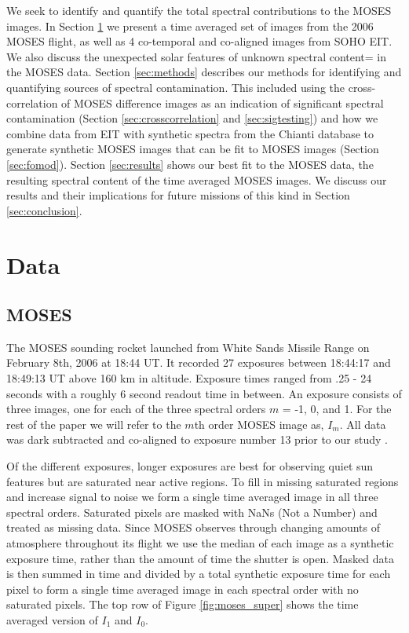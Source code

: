 	We seek to identify and quantify the total spectral contributions to the MOSES images.
	In Section \ref{sec:data} we present a time averaged set of images from the 2006 MOSES flight, as well as 4 co-temporal and co-aligned images from SOHO EIT.
	We also discuss the unexpected solar features of unknown spectral content= in the MOSES data.
	Section \ref{sec:methods} describes our methods for identifying and quantifying sources of spectral contamination.  
	This included using the cross-correlation of MOSES difference images as an indication of significant spectral contamination (Section \ref{sec:crosscorrelation} and \ref{sec:sigtesting}) and how we combine data from EIT with synthetic spectra from the Chianti database \citep{ChiantiI,ChiantiX} to generate synthetic MOSES images that can be fit to MOSES images (Section \ref{sec:fomod}).
	Section \ref{sec:results} shows our best fit to the MOSES data, the resulting spectral content of the time averaged MOSES images.
	We discuss our results and their implications for future missions of this kind in Section \ref{sec:conclusion}.   


\section{Data}\label{sec:data}

	\subsection{MOSES}\label{sec:MOSES_data}
	
		The MOSES sounding rocket launched from White Sands Missile Range on February 8th, 2006 at 18:44 UT. 
		It recorded 27 exposures between 18:44:17 and 18:49:13 UT above 160 km in altitude.  
		Exposure times ranged from .25 - 24 seconds with a roughly 6 second readout time in between.  
		An exposure consists of three images, one for each of the three spectral orders $m$ = -1, 0, and 1.
		For the rest of the paper we will refer to the $m$th order MOSES image as, $I_m$.  
		All data was dark subtracted and co-aligned to exposure number 13 prior to our study \citep{Fox2011}. 
		
		Of the different exposures, longer exposures are best for observing quiet sun features but are saturated near active regions.  
		To fill in missing saturated regions and increase signal to noise we form a single time averaged image in all three spectral orders. 
		Saturated pixels are masked with NaNs (Not a Number) and treated as missing data. 
		Since MOSES observes through changing amounts of atmosphere throughout its flight we use the median of each image as a synthetic exposure time, rather than the amount of time the shutter is open.
		Masked data is then summed in time and divided by a total synthetic exposure time for each pixel to form a single time averaged image in each spectral order with no saturated pixels.  
		The top row of Figure \ref{fig:moses_super} shows the time averaged version of $I_1$ and $I_0$. 
		
